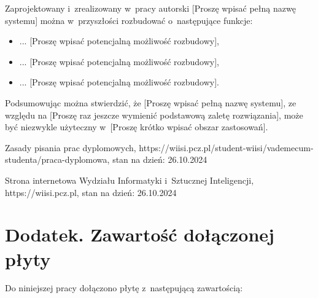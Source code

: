 \documentclass{PracaDyplomowa-Szablon}
\begin{document}
Zaprojektowany i~zrealizowany w~pracy autorski [Proszę wpisać pełną nazwę systemu] można w~przyszłości rozbudować o~następujące funkcje:

\begin{itemize}
\item ... [Proszę wpisać potencjalną możliwość rozbudowy],
\item ... [Proszę wpisać potencjalną możliwość rozbudowy],
\item ... [Proszę wpisać potencjalną możliwość rozbudowy].
\end{itemize}

Podsumowując można stwierdzić, że [Proszę wpisać pełną nazwę systemu], ze względu na [Proszę raz jeszcze wymienić podstawową zaletę rozwiązania], może być niezwykle użyteczny w~[Proszę krótko wpisać obszar zastosowań].

\cleardoublepage
\begin{thebibliography}{99}


 Zasady pisania prac dyplomowych, https://wiisi.pcz.pl/student-wiisi/vademecum-studenta/praca-dyplomowa, stan na dzień: 26.10.2024

 Strona internetowa Wydziału Informatyki i~Sztucznej Inteligencji, https://wiisi.pcz.pl, stan na dzień: 26.10.2024

\end{thebibliography}

\chapter*{Dodatek. Zawartość dołączonej płyty}

Do niniejszej pracy dołączono płytę z~następującą zawartością:
\end{document}
